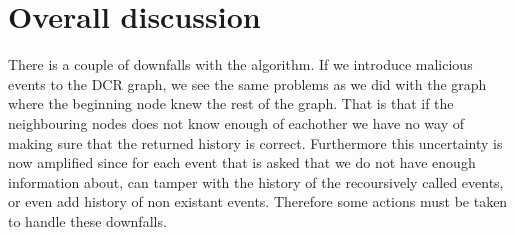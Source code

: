 	
	\section{Overall discussion}
	There is a couple of downfalls with the algorithm. If we introduce malicious events to the DCR graph, we see the same problems as we did with the graph where the beginning node knew the rest of the graph. That is that if the neighbouring nodes does not know enough of eachother we have no way of making sure that the returned history is correct. Furthermore this uncertainty is now amplified since for each event that is asked that we do not have enough information about, can tamper with the history of the recoursively called events, or even add history of non existant events. Therefore some actions must be taken to handle these downfalls.
	